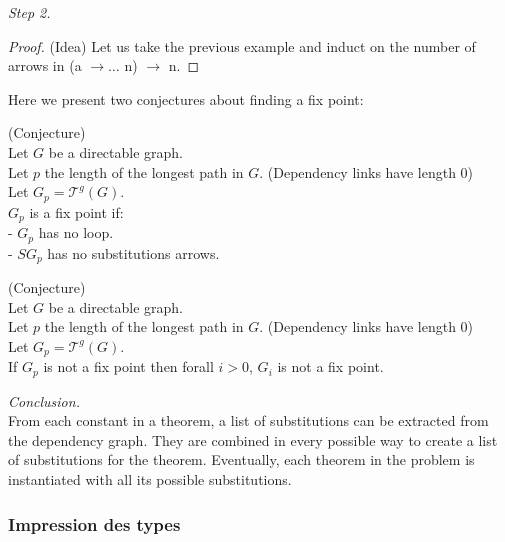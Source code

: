 \noindent \textit{Step 2.}

\begin{center}
\end{center}

\begin{proof}(Idea)
Let us take the previous example and induct on the number of arrows in (a $\rightarrow \ldots$ n) $\rightarrow$ n.
\end{proof}
\pagebreak
\noindent Here we present two conjectures about finding a fix point: 
\begin{thm}(Conjecture)
\\Let $G$ be a directable graph.
\\Let $p$ the length of the longest path in $G$. (Dependency links have length 0) 
\\Let $G_p = \mathcal{T}^g(G)$.
\\$G_p$ is a fix point if:
\\- $G_p$ has no loop.
\\- $SG_p$ has no substitutions arrows.
\end{thm} 
\begin{thm}(Conjecture)
\\Let $G$ be a directable graph.
\\Let $p$ the length of the longest path in $G$. (Dependency links have length 0) 
\\Let $G_p = \mathcal{T}^g(G)$.
\\If $G_p$ is not a fix point then forall $i>0$, $G_i$ is not a fix point.
\end{thm} 

\noindent \textit{Conclusion.}
\\From each constant in a theorem, a list of substitutions can be extracted from the dependency graph. They are combined in every possible way to create a list of substitutions for the theorem. Eventually, each theorem in the problem is instantiated with all its possible substitutions.
\fi

\subsubsection{Impression des types}

